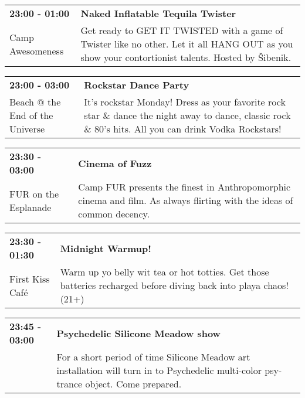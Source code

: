 \begin{tabular}{ p{1in} p{2.2in} }
    \textbf{23:00 - 01:00} & \textbf{Naked Inflatable Tequila Twister} \\
    Camp Awesomeness \newline  & Get ready to GET IT TWISTED with a game of Twister like no other. Let it all HANG OUT as you show your contortionist talents. Hosted by \v Sibenik. \\
    \hline 
\end{tabular}
    
\begin{tabular}{ p{1in} p{2.2in} }
    \textbf{23:00 - 03:00} & \textbf{Rockstar Dance Party} \\
    Beach @ the End of the Universe \newline  & It's rockstar Monday! Dress as your favorite rock star \& dance the night away to dance, classic rock \& 80's hits. All you can drink Vodka Rockstars! \\
    \hline 
\end{tabular}
    
\begin{tabular}{ p{1in} p{2.2in} }
    \textbf{23:30 - 03:00} & \textbf{Cinema of Fuzz } \\
    FUR \newline 6.45 on the Esplanade & Camp FUR presents the finest in Anthropomorphic cinema and film. As always flirting with the ideas of common decency. \\
    \hline 
\end{tabular}
    
\begin{tabular}{ p{1in} p{2.2in} }
    \textbf{23:30 - 01:30} & \textbf{Midnight Warmup!} \\
    First Kiss Caf\'e \newline  & Warm up yo belly wit tea or hot totties.  Get those batteries recharged before diving back into playa chaos! (21+) \\
    \hline 
\end{tabular}
    
\begin{tabular}{ p{1in} p{2.2in} }
    \textbf{23:45 - 03:00} & \textbf{Psychedelic Silicone Meadow show} \\
    ~ \newline  & For a short period of time Silicone Meadow art installation will turn in to Psychedelic multi-color psy-trance object. Come prepared. \\
    \hline 
\end{tabular}
    
